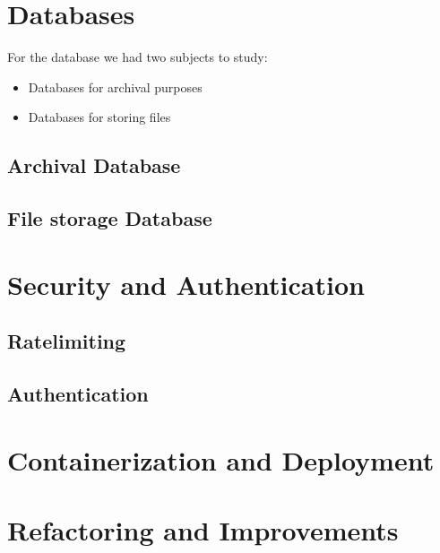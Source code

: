 \section {Databases}

For the database we had two subjects to study:
\begin{itemize}
        \item Databases for archival purposes
        \item Databases for storing files
    \end{itemize}

\subsection {Archival Database}


\subsection {File storage Database}


\section {Security and Authentication}

\subsection {Ratelimiting}


\subsection {Authentication}


\section {Containerization and Deployment}


\section {Refactoring and Improvements}

